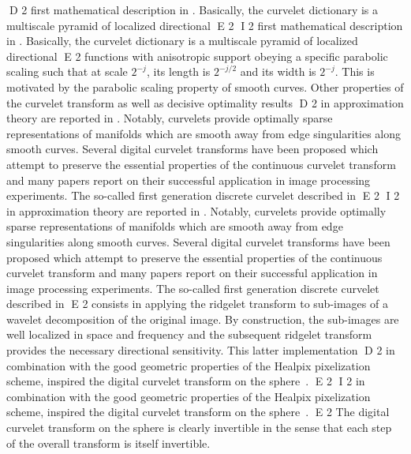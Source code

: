 D 2
first mathematical description in \cite{Curvelets-StMalo}. Basically, the curvelet dictionary is a multiscale pyramid of localized directional 
E 2
I 2
first mathematical description in \citep{Curvelets-StMalo}. Basically, the curvelet dictionary is a multiscale pyramid of localized directional 
E 2
functions with anisotropic support obeying a specific parabolic scaling such that at scale $2^{-j}$, its length is $2^{-j/2}$ and its width is $2^{-j}$. 
This is motivated by the parabolic scaling property of smooth curves. Other properties of the curvelet transform as well as decisive optimality results 
D 2
in approximation theory are reported in \cite{Curvelets-StMalo,CandesDonohoCurvelets}. Notably, curvelets provide optimally sparse representations 
of manifolds which are smooth away from edge singularities along smooth curves. Several digital curvelet transforms \cite{cur:donoho99,starck:sta01_3,cur:demanet06} 
have been proposed which attempt to preserve the essential properties of the continuous curvelet transform and many papers \cite{starck:sta04,felix2008,starck:sta04} 
report on their successful application in image processing experiments. The so-called first generation discrete curvelet described in \cite{cur:donoho99,starck:sta01_3} 
E 2
I 2
in approximation theory are reported in \citep{Curvelets-StMalo}. Notably, curvelets provide optimally sparse representations 
of manifolds which are smooth away from edge singularities along smooth curves. Several digital curvelet transforms \citep{cur:donoho99,starck:sta01_3,cur:demanet06} 
have been proposed which attempt to preserve the essential properties of the continuous curvelet transform and many papers \citep{starck:sta04,felix2008,starck:sta04} 
report on their successful application in image processing experiments. The so-called first generation discrete curvelet described in \citep{cur:donoho99,starck:sta01_3} 
E 2
consists in applying the ridgelet transform to sub-images of a wavelet decomposition of the original image. By construction, the sub-images are 
well localized in space and frequency and the subsequent ridgelet transform provides the necessary directional sensitivity. This latter implementation 
D 2
in combination with the good geometric properties of the Healpix pixelization scheme, inspired the digital curvelet transform on the sphere~\cite{starck:sta05_2}. 
E 2
I 2
in combination with the good geometric properties of the Healpix pixelization scheme, inspired the digital curvelet transform on the sphere~\citep{starck:sta05_2}. 
E 2
The digital curvelet transform on the sphere is clearly invertible in the sense that each step of the overall transform is itself invertible. 
